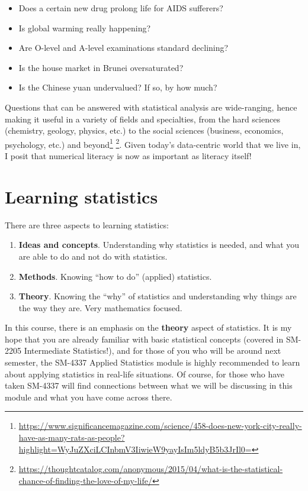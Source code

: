 \documentclass[
]{book}
\providecommand{\tightlist}{%
  \setlength{\itemsep}{0pt}\setlength{\parskip}{0pt}}
\theoremstyle{definition}
\theoremstyle{definition}
\theoremstyle{definition}
\theoremstyle{definition}
\theoremstyle{remark}
\begin{document}
\begin{itemize}
\tightlist
\item
  Does a certain new drug prolong life for AIDS sufferers?
\item
  Is global warming really happening?
\item
  Are O-level and A-level examinations standard declining?
\item
  Is the house market in Brunei oversaturated?
\item
  Is the Chinese yuan undervalued? If so, by how much?
\end{itemize}

Questions that can be answered with statistical analysis are wide-ranging, hence making it useful in a variety of fields and specialties, from the hard sciences (chemistry, geology, physics, etc.) to the social sciences (business, economics, psychology, etc.) and beyond\footnote{\url{https://www.significancemagazine.com/science/458-does-new-york-city-really-have-as-many-rats-as-people?highlight=WyJuZXciLCInbmV3IiwieW9yayIsIm5ldyB5b3JrIl0=}} \footnote{\url{https://thoughtcatalog.com/anonymous/2015/04/what-is-the-statistical-chance-of-finding-the-love-of-my-life/}}.
Given today's data-centric world that we live in, I posit that numerical literacy is now as important as literacy itself!

\hypertarget{learning-statistics}{%
\section*{Learning statistics}\label{learning-statistics}}

There are three aspects to learning statistics:

\begin{enumerate}
\def\labelenumi{\arabic{enumi}.}
\item
  \textbf{Ideas and concepts}. Understanding why statistics is needed, and what you are able to do and not do with statistics.
\item
  \textbf{Methods}. Knowing ``how to do'' (applied) statistics.
\item
  \textbf{Theory}. Knowing the ``why'' of statistics and understanding why things are the way they are. Very mathematics focused.
\end{enumerate}

In this course, there is an emphasis on the \textbf{theory} aspect of statistics. It is my hope that you are already familiar with basic statistical concepts (covered in SM-2205 Intermediate Statistics!), and for those of you who will be around next semester, the SM-4337 Applied Statistics module is highly recommended to learn about applying statistics in real-life situations. Of course, for those who have taken SM-4337 will find connections between what we will be discussing in this module and what you have come across there.
\end{document}
